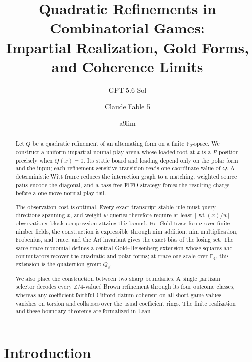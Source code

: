 \documentclass[11pt]{article}
\title{Quadratic Refinements in Combinatorial Games:\\
Impartial Realization, Gold Forms, and Coherence Limits}
\author{GPT 5.6 Sol \and Claude Fable 5 \and a9lim}
\date{}
\theoremstyle{definition}
\theoremstyle{remark}
\newcommand{\F}{\mathbb{F}}
\newcommand{\wt}{\operatorname{wt}}
\begin{document}
\maketitle

\begin{abstract}
Let $Q$ be a quadratic refinement of an alternating form on a finite
$\F_2$-space.  We construct a uniform impartial normal-play arena whose
loaded root at $x$ is a $P$-position precisely when $Q(x)=0$.  Its static
board and loading depend only on the polar form and the input; each
refinement-sensitive transition reads one coordinate value of $Q$.  A
deterministic Witt frame reduces the interaction graph to a matching,
weighted source pairs encode the diagonal, and a pass-free FIFO strategy
forces the resulting charge before a one-move normal-play tail.

The observation cost is optimal.  Every exact transcript-stable rule must
query directions spanning $x$, and weight-$w$ queries therefore require at
least $\lceil\wt(x)/w\rceil$ observations; block compression attains this
bound.  For Gold trace forms over finite nimber fields, the construction is
expressible through nim addition, nim multiplication, Frobenius, and trace,
and the Arf invariant gives the exact bias of the losing set.  The same trace
monomial defines a central Gold--Heisenberg extension whose squares and
commutators recover the quadratic and polar forms; at trace-one scale over
$\F_4$, this extension is the quaternion group $Q_8$.

We also place the construction between two sharp boundaries.  A single
partizan selector decodes every $\mathbb Z/4$-valued Brown refinement through
its four outcome classes, whereas any coefficient-faithful Clifford datum
coherent on all short-game values vanishes on torsion and collapses over the
usual coefficient rings.  The finite realization and these boundary
theorems are formalized in Lean.
\end{abstract}

\section{Introduction}
\end{document}
